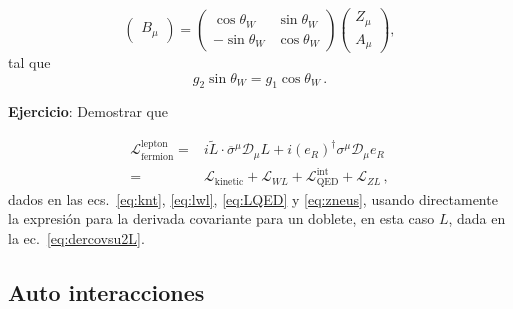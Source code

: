 \begin{frame}
\begin{itemize}
\begin{equation}
\begin{pmatrix}
    B_\mu
  \end{pmatrix}=\begin{pmatrix}
    \cos\theta_W & \sin\theta_W\\
    -\sin\theta_W& \cos\theta_W
  \end{pmatrix}
  \begin{pmatrix}
    Z_\mu\\
    A_\mu
  \end{pmatrix},
\end{equation}
tal que
\begin{equation}
  \label{eq:tw}
  g_2\sin\theta_W={g_1}\cos\theta_W\,.
\end{equation}
\end{itemize} %

\end{frame}

\bigskip
\noindent
\textbf{Ejercicio}: Demostrar que

\begin{align}
  \mathcal{L}_{\text{fermion}}^{\text{lepton}}=& i \widetilde{L}\cdot\overline{\sigma}^\mu\mathcal{D}_\mu L+  i \left( e_R \right)^{\dagger}{\sigma}^\mu\mathcal{D}_\mu e_R \nonumber\\
 =&\mathcal{L}_{\text{kinetic}}+
\mathcal{L}_{WL}+\mathcal{L}^{\text{int}}_{\text{QED}}+ \mathcal{L}_{ZL}\,,
\end{align}
dados en las ecs.~\eqref{eq:knt}, \eqref{eq:lwl}, \eqref{eq:LQED} y \eqref{eq:zneus}, usando directamente la expresión para la derivada covariante para un doblete, en esta caso $L$, dada  en la ec.~\eqref{eq:dercovsu2L}.


\subsection{Auto interacciones}

